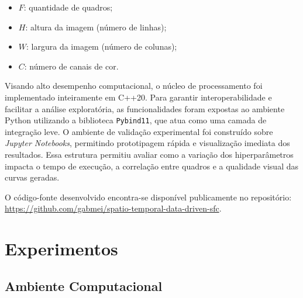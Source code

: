 \documentclass[12pt]{article}
\begin{document}
\begin{itemize}
    \item $F$: quantidade de quadros;
    \item $H$: altura da imagem (número de linhas);
    \item $W$: largura da imagem (número de colunas);
    \item $C$: número de canais de cor.
\end{itemize}

Visando alto desempenho computacional, o núcleo de processamento foi implementado inteiramente em C++20.
Para garantir interoperabilidade e facilitar a análise exploratória, as funcionalidades foram expostas ao ambiente
Python utilizando a biblioteca \texttt{Pybind11}, que atua como uma camada de integração leve. O ambiente de
validação experimental foi construído sobre \textit{Jupyter Notebooks}, permitindo prototipagem
rápida e visualização imediata dos resultados. Essa estrutura permitiu avaliar como a variação dos hiperparâmetros
impacta o tempo de execução, a correlação entre quadros e a qualidade visual das curvas geradas.

O código-fonte desenvolvido encontra-se disponível publicamente no repositório: \url{https://github.com/gabmei/spatio-temporal-data-driven-sfc}.

\section{Experimentos}


\subsection{Ambiente Computacional}
\end{document}
